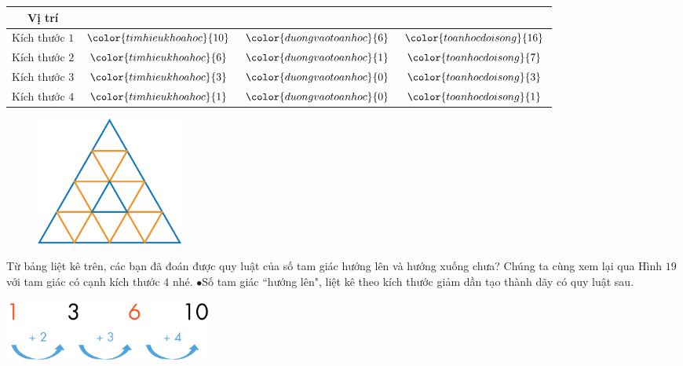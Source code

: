 \begin{multicols}{2}
	\begin{table}[H]
		\setlength{\tabcolsep}{2pt}
		\renewcommand{\arraystretch}{1.3}
		\begin{tabular}{|c|c|c|c|}
			\hline
			Vị trí & {\color{timhieukhoahoc}{Lên}}  & {\color{duongvaotoanhoc}{Xuống}} & {\color{toanhocdoisong}{Tổng}}\\
			\hline
			Kích thước $1$  & ${\color{timhieukhoahoc}{10}}$ &${\color{duongvaotoanhoc}{6}}$ & ${\color{toanhocdoisong}{16}}$ \\
			\hline
			Kích thước $2$  & ${\color{timhieukhoahoc}{6}}$ & ${\color{duongvaotoanhoc}{1}}$ &  ${\color{toanhocdoisong}{7}}$ \\
			\hline
			Kích thước $3$  & ${\color{timhieukhoahoc}{3}}$ & ${\color{duongvaotoanhoc}{0}}$ & ${\color{toanhocdoisong}{3}}$\\
			\hline
			Kích thước $4$  & ${\color{timhieukhoahoc}{1}}$ & ${\color{duongvaotoanhoc}{0}}$ & ${\color{toanhocdoisong}{1}}$\\
			\hline
		\end{tabular}
	\end{table}
	\begin{figure}[H]
		\vspace*{5pt}
		\centering
		\captionsetup{labelformat= empty, justification=centering}
		\includegraphics[width=0.235\textwidth]{Hinh25_1}
		\caption{}
		\vspace*{-10pt}
	\end{figure}
\end{multicols}
Từ bảng liệt kê trên, các bạn đã đoán được quy luật của số tam giác hướng lên và hướng xuống chưa? Chúng ta cùng xem lại qua  Hình $19$ với tam giác có cạnh kích thước $4$ nhé.
\vskip 0.1cm
$\bullet$Số tam giác ``hướng lên", liệt kê theo kích thước giảm dần tạo thành dãy có quy luật sau.
\begin{center}
	\includegraphics[width=0.3\textwidth]{QuyLuat}
\end{center}	
